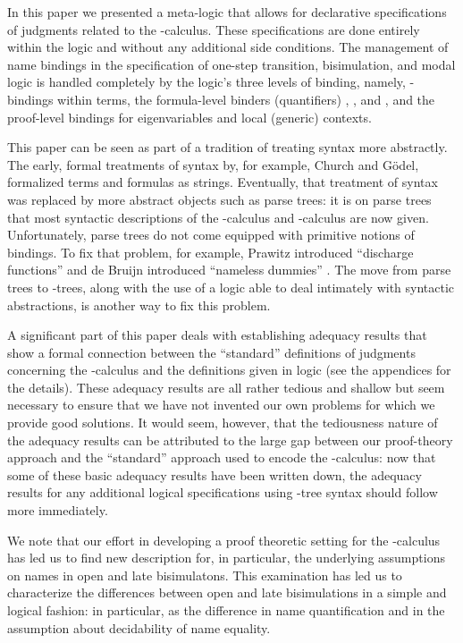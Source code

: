 \documentclass{acmtrans2m}
\begin{document}
In this paper we presented a meta-logic that allows for declarative specifications of
judgments related to the -calculus.
These specifications are done entirely within the logic and without any
additional side conditions.  The management of name bindings in the
specification of one-step transition, bisimulation, and modal logic is
handled completely by the logic's three levels of binding,
namely, -bindings within terms, the formula-level
binders (quantifiers) , , and , and the
proof-level bindings for eigenvariables and local (generic) contexts.

This paper can be seen as part of a tradition of treating
syntax more abstractly.   The early, formal treatments of syntax by, for
example, Church and G\"odel, formalized terms and formulas as strings.
Eventually, that treatment of syntax was replaced by more abstract
objects such as parse trees: it is on parse trees that most
syntactic descriptions of the -calculus and -calculus
are now given.  Unfortunately, parse trees do not come equipped with
primitive notions of bindings.  To fix that problem, for example,
Prawitz introduced ``discharge functions'' \cite{prawitz65} and de
Bruijn introduced ``nameless dummies'' \cite{debruijn72}.  The move
from parse trees to -trees, along with the use of a logic
able to deal intimately with syntactic abstractions, is another way to
fix this problem.

A significant part of this paper deals with establishing adequacy
results that show a formal connection between the ``standard''
definitions of judgments concerning the -calculus and the
definitions given in logic (see the appendices for the details).
These adequacy results are all 
rather tedious and shallow but seem necessary to ensure that we have
not invented our own problems for which we provide good solutions.  It
would seem, however, that the tediousness nature of the adequacy
results can be
attributed to the large gap between our proof-theory approach and
the ``standard'' approach used to encode the
-calculus: now that some of these basic adequacy results have
been written down, the adequacy results for any additional logical
specifications using -tree syntax should follow more
immediately.

We note that our effort in developing a proof theoretic setting for
the -calculus has led us to find new description for, in
particular, the underlying assumptions on names in open and late
bisimulatons.  This examination has led us to characterize the
differences between open and late bisimulations in a simple and
logical fashion: in particular, as the difference in name
quantification and in the assumption about decidability of name
equality.
\end{document}
